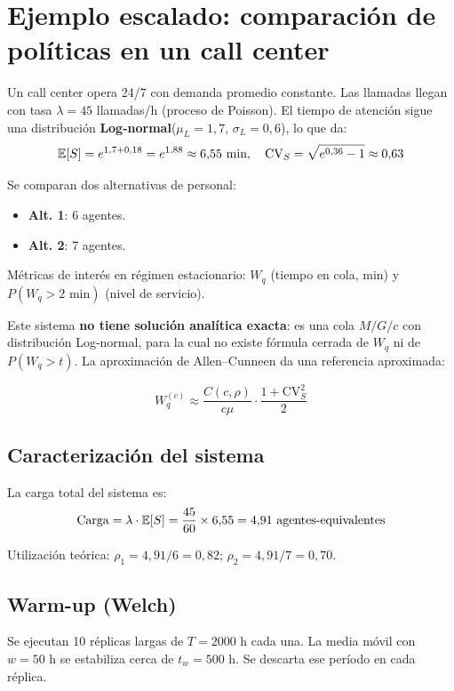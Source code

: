 \documentclass[11pt, letterpaper]{article}
\begin{document}
\section{Ejemplo escalado: comparación de políticas en un call center}

\begin{ejemplobox}[Sistema]
Un call center opera 24/7 con demanda promedio constante. Las llamadas llegan con tasa $\lambda=45$ llamadas/h (proceso de Poisson). El tiempo de atención sigue una distribución \textbf{Log-normal}($\mu_L=1{,}7$, $\sigma_L=0{,}6$), lo que da:
\[
\mathbb{E}[S] = e^{1{,}7+0{,}18} = e^{1{,}88} \approx 6{,}55 \text{ min}, \quad
\text{CV}_S = \sqrt{e^{0{,}36}-1} \approx 0{,}63
\]

Se comparan dos alternativas de personal:
\begin{itemize}
    \item \textbf{Alt. 1}: 6 agentes.
    \item \textbf{Alt. 2}: 7 agentes.
\end{itemize}

Métricas de interés en régimen estacionario: $W_q$ (tiempo en cola, min) y $P(W_q>2\text{ min})$ (nivel de servicio).
\end{ejemplobox}

Este sistema \textbf{no tiene solución analítica exacta}: es una cola $M/G/c$ con distribución Log-normal, para la cual no existe fórmula cerrada de $W_q$ ni de $P(W_q > t)$. La aproximación de Allen--Cunneen da una referencia aproximada:

\[
W_q^{(c)} \approx \frac{C(c,\rho)}{c\mu} \cdot \frac{1+\text{CV}_S^2}{2}
\]

\subsection{Caracterización del sistema}

La carga total del sistema es:
\[
\text{Carga} = \lambda \cdot \mathbb{E}[S] = \frac{45}{60} \times 6{,}55 = 4{,}91 \text{ agentes-equivalentes}
\]

Utilización teórica: $\rho_1 = 4{,}91/6 = 0{,}82$; $\rho_2 = 4{,}91/7 = 0{,}70$.

\subsection{Warm-up (Welch)}

Se ejecutan 10 réplicas largas de $T=2000$ h cada una. La media móvil con $w=50$ h se estabiliza cerca de $t_w=500$ h. Se descarta ese período en cada réplica.
\end{document}
